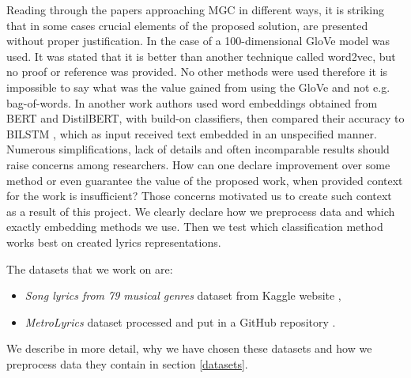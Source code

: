 Reading through the papers approaching MGC in different ways, it is striking that in some cases crucial elements of the proposed solution, are presented without proper justification. In the case of \cite{sig_emb} a 100-dimensional GloVe model was used. It was stated that it is better than another technique called word2vec, but no proof or reference was provided. No other methods were used therefore it is impossible to say what was the value gained from using the GloVe and not e.g. bag-of-words.  In another work \cite{sig_bert} authors used word embeddings obtained from BERT and DistilBERT, with build-on classifiers, then compared their accuracy to BILSTM \cite{bilstm}, which as input received text embedded in an unspecified manner. Numerous simplifications, lack of details and often incomparable results should raise concerns among researchers. How can one declare improvement over some method or even guarantee the value of the proposed work, when provided context for the work is insufficient? Those concerns motivated us to create such context as a result of this project. We clearly declare how we preprocess data and which exactly embedding methods we use. Then we test which classification method works best on created lyrics representations. 

The datasets that we work on are:
\begin{itemize}
    \item \textit{Song lyrics from 79 musical genres} dataset from Kaggle website \cite{KaggleDataset},
    \item \textit{MetroLyrics} dataset processed and put in a GitHub repository \cite{GithubDataset}.
\end{itemize}
We describe in more detail, why we have chosen these datasets and how we preprocess data they contain in section \ref{datasets}.

